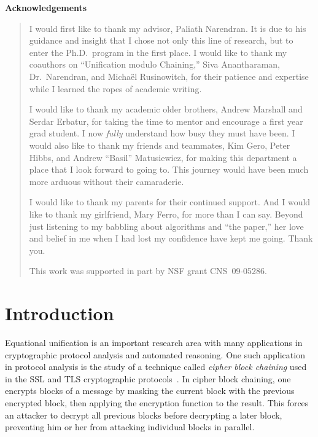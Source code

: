 \documentclass[11pt]{article}
\begin{document}
\clearpage

\begin{center}
    \textbf{Acknowledgements}
\end{center}
\begin{quotation}
I would first like to thank my advisor, Paliath Narendran. It is due to his
guidance and insight that I chose not only this line of research, but to enter
the Ph.D.\ program in the first place.
I would like to thank my coauthors on ``Unification modulo Chaining,'' Siva
Anantharaman, Dr.\ Narendran, and Micha\"{e}l Rusinowitch, for their patience
and expertise while I learned the ropes of academic writing.

I would like to thank my academic older brothers, Andrew Marshall and Serdar
Erbatur, for taking the time to mentor and encourage a first year grad student.
I now \emph{ful{}ly} understand how busy they must have been.
I would also like to thank my friends and teammates, Kim Gero, Peter Hibbs, and
Andrew ``Basil'' Matusiewicz, for making this department a place that I look
forward to going to. This journey would have been much more arduous without
their camaraderie.

I would like to thank my parents for their continued support.
And I would like to thank my girlfriend, Mary Ferro, for more than I can say.
Beyond just listening to my babbling about algorithms and ``the paper,'' her
love and belief in me when I had lost my confidence have kept me going. Thank
you.

This work was supported in part by NSF grant CNS~09-05286.
\end{quotation}

\cleardoublepage
\tableofcontents

\clearpage
{}

\section{Introduction}\label{section:intro}

Equational unification is an important research area with many applications in
cryptographic protocol analysis and automated reasoning. One such application
in protocol analysis is the study of a technique called \emph{cipher block
chaining} used in the SSL and TLS cryptographic protocols~\cite{rfc5246}. In
cipher block chaining, one encrypts blocks of a message by masking the current
block with the previous encrypted block, then applying the encryption function
to the result. This forces an attacker to decrypt all previous blocks before
decrypting a later block, preventing him or her from attacking individual
blocks in parallel.
\end{document}
